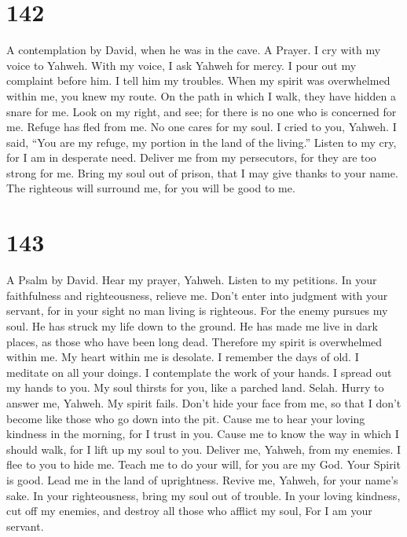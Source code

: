 \hypertarget{section-132}{%
\section{142}\label{section-132}}

A contemplation by David, when he was in the cave. A Prayer.
 I cry with my voice to Yahweh. With my voice, I ask Yahweh
for mercy.  I pour out my complaint before him. I tell him
my troubles.  When my spirit was overwhelmed within me, you
knew my route. On the path in which I walk, they have hidden a snare for
me.  Look on my right, and see; for there is no one who is
concerned for me. Refuge has fled from me. No one cares for my soul.
 I cried to you, Yahweh. I said, ``You are my refuge, my
portion in the land of the living.''  Listen to my cry, for
I am in desperate need. Deliver me from my persecutors, for they are too
strong for me.  Bring my soul out of prison, that I may give
thanks to your name. The righteous will surround me, for you will be
good to me.

\hypertarget{section-133}{%
\section{143}\label{section-133}}

A Psalm by David.  Hear my prayer, Yahweh. Listen to my
petitions. In your faithfulness and righteousness, relieve me.
 Don't enter into judgment with your servant, for in your
sight no man living is righteous.  For the enemy pursues my
soul. He has struck my life down to the ground. He has made me live in
dark places, as those who have been long dead.  Therefore my
spirit is overwhelmed within me. My heart within me is desolate.
 I remember the days of old. I meditate on all your doings.
I contemplate the work of your hands.  I spread out my hands
to you. My soul thirsts for you, like a parched land. Selah.
 Hurry to answer me, Yahweh. My spirit fails. Don't hide
your face from me, so that I don't become like those who go down into
the pit.  Cause me to hear your loving kindness in the
morning, for I trust in you. Cause me to know the way in which I should
walk, for I lift up my soul to you.  Deliver me, Yahweh,
from my enemies. I flee to you to hide me.  Teach me to do
your will, for you are my God. Your Spirit is good. Lead me in the land
of uprightness.  Revive me, Yahweh, for your name's sake.
In your righteousness, bring my soul out of trouble.  In
your loving kindness, cut off my enemies, and destroy all those who
afflict my soul, For I am your servant.

